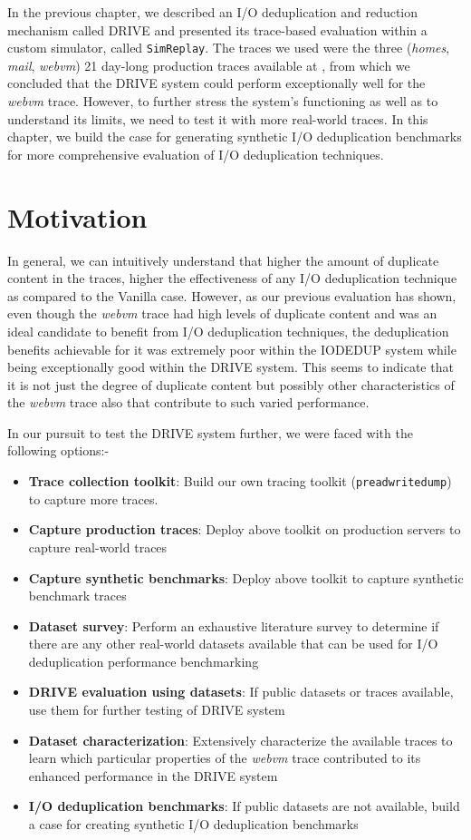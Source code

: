In the previous chapter, we described an I/O deduplication and reduction
mechanism called DRIVE and presented its trace-based evaluation within 
a custom simulator, called \texttt{SimReplay}. The traces we used were
the three (\textit{homes}, \textit{mail}, \textit{webvm}) 21 day-long 
production traces available at \cite{iodedup-online}, from which we 
concluded that the DRIVE system could perform exceptionally well for
the \textit{webvm} trace. However, to further stress the system's
functioning as well as to understand its limits, we need to test it
with more real-world traces. In this chapter, we build the case
for generating synthetic I/O deduplication benchmarks for more
comprehensive evaluation of I/O deduplication techniques.

\section{Motivation}
In general, we can intuitively understand that higher the amount of
duplicate content in the traces, higher the effectiveness of any 
I/O deduplication technique as compared to the Vanilla case. 
However, as our previous evaluation
has shown, even though the \textit{webvm} trace had high levels 
of duplicate content and was an ideal candidate to benefit from
I/O deduplication techniques, the deduplication benefits achievable 
for it was extremely poor
within the IODEDUP system while being exceptionally good within
the DRIVE system. This seems to indicate that it is not just 
the degree of duplicate content but possibly other characteristics
of the \textit{webvm} trace also that contribute to such varied performance.

In our pursuit to test the DRIVE system further, we 
were faced with the following options:-
\begin{itemize}
	\item \textbf{Trace collection toolkit}: Build our own tracing toolkit (\texttt{preadwritedump}) to capture more traces. 
	\item \textbf{Capture production traces}: Deploy above toolkit on production servers to capture real-world traces
	\item \textbf{Capture synthetic benchmarks}: Deploy above toolkit to capture synthetic benchmark traces 
	\item \textbf{Dataset survey}: Perform an exhaustive literature survey to determine if there are any other real-world datasets available that can be used for I/O deduplication performance benchmarking
	\item \textbf{DRIVE evaluation using datasets}: If public datasets or traces available, use them for further testing of DRIVE system
	\item \textbf{Dataset characterization}: Extensively characterize the available traces to learn which particular properties of the \textit{webvm} trace contributed to its enhanced performance in the DRIVE system
	\item \textbf{I/O deduplication benchmarks}: If public datasets are not available, build a case for creating synthetic I/O deduplication benchmarks
\end{itemize}

